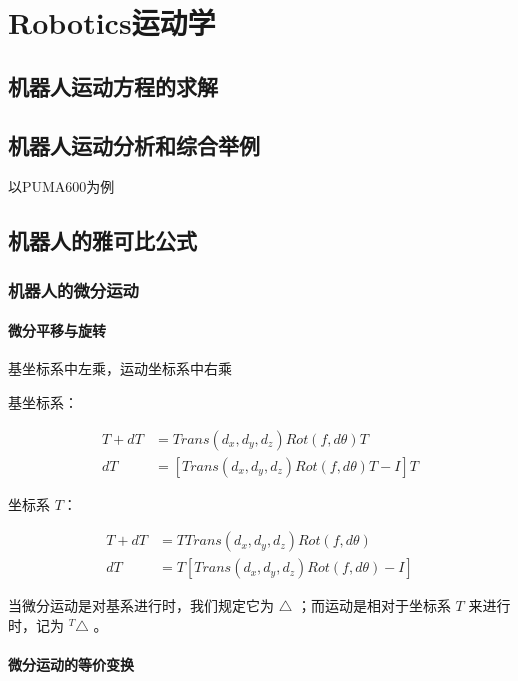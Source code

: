 \documentclass[11pt]{book}
\begin{document}
\chapter{Robotics运动学}

\section{机器人运动方程的求解}

\section{机器人运动分析和综合举例}

以PUMA600为例

\section{机器人的雅可比公式}

\subsection{机器人的微分运动}

\subsubsection{微分平移与旋转}%
\label{ssub:wei_fen_ping_yi_yu_xuan_zhuan_}

基坐标系中左乘，运动坐标系中右乘

基坐标系：

$$
\begin{array}{ll}
	T + dT &= Trans(d_x, d_y, d_z)Rot(f,d \theta)T \\
	dT &= [Trans(d_x, d_y, d_z)Rot(f,d \theta)T - I]T
\end{array}
$$

坐标系 ${T}$：

$$
\begin{array}{ll}
	T + dT &= TTrans(d_x, d_y, d_z)Rot(f, d \theta) \\
	dT &= T[Trans(d_x, d_y, d_z)Rot(f, d \theta) - I]
\end{array}
$$

	当微分运动是对基系进行时，我们规定它为 $\triangle$ ；而运动是相对于坐标系 ${T}$ 来进行时，记为 ${}^T \triangle$ 。


\subsubsection{微分运动的等价变换}%
\label{ssub:wei_fen_yun_dong_de_deng_jie_bian_huan_}
\end{document}

